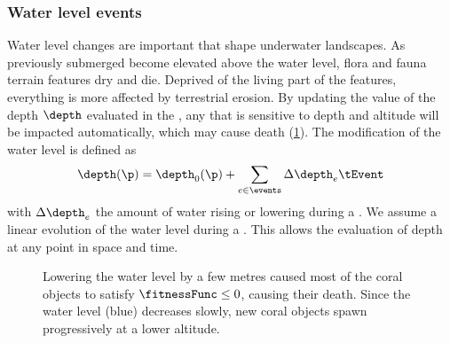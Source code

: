 \subsubsection{Water level events}
Water level changes are important  that shape underwater landscapes. As previously submerged  become elevated above the water level, flora and fauna terrain features dry and die. Deprived of the living part of the features, everything is more affected by terrestrial erosion. By updating the value of the depth $\depth$ evaluated in the , any  that is sensitive to depth and altitude will be impacted automatically, which may cause death (\cref{fig:env-obj-water-event}). The modification of the water level is defined as
\begin{align}
\depth(\p) = \depth_0(\p) + \sum_{e \in \events} \Delta \depth_e \tEvent
\end{align}
with $\Delta \depth_e$ the amount of water rising or lowering during a . We assume a linear evolution of the water level during a . This allows the evaluation of depth at any point in space and time.

\begin{figure}
\caption{Lowering the water level by a few metres caused most of the coral objects to satisfy $\fitnessFunc \leq 0$, causing their death. Since the water level (blue) decreases slowly, new coral objects spawn progressively at a lower altitude.}
\label{fig:env-obj-water-event}
\end{figure}

